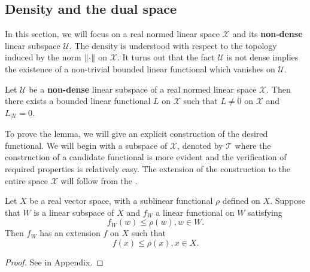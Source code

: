 \subsection{Density and the dual space}
\label{subsection:universality:cybenko:3}

In this section, we will focus on a real normed linear space $\mathcal{X}$ and its \textbf{non-dense} linear subspace $\mathcal{U}$. The density is understood with respect to the topology induced by the norm $\left\lVert\cdot\right\rVert$ on $\mathcal{X}$. It turns out that the fact $\mathcal{U}$ is not dense implies the existence of a non-trivial bounded linear functional which vanishes on $\mathcal{U}$.
\begin{lemma}
\label{lemma:univ:sepfunclemma}
Let $\mathcal{U}$ be a \textbf{non-dense} linear subspace of a real normed linear space $\mathcal{X}$.
Then there exists a bounded linear functional $L$ on $\mathcal{X}$ such that $L \neq 0$ on $\mathcal{X}$ and $L_{| \mathcal{U}} = 0$.
\end{lemma}
\begin{proof-idea*}
To prove the lemma, we will give an explicit construction of the desired functional. We will begin with a subspace of $\mathcal{X}$, denoted by $\mathcal{T}$ where the construction of a candidate functional is more evident and the verification of required properties is relatively easy. The extension of the construction to the entire space $\mathcal{X}$ will follow from the . 
\begin{theorem*}
Let $X$ be a real vector space, with a sublinear functional $\rho$ defined on $X$.
Suppose that $W$ is a linear subspace of $X$ and $f_W$ a linear functional on $W$ satisfying
\begin{equation}
    f_W(w) \leq \rho(w), w \in W.
\end{equation}
Then $f_W$ has an extension $f$ on $X$ such that 
\begin{equation}
    f(x) \leq \rho(x), x \in X.
\end{equation}
\end{theorem*}
\begin{proof}
See  in Appendix.
\end{proof}
\end{proof-idea*}

